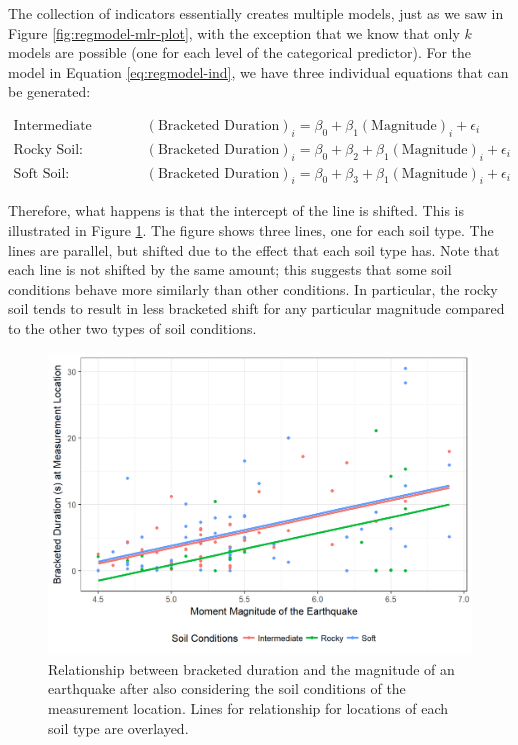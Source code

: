 \documentclass[]{book}
\theoremstyle{definition}
\theoremstyle{definition}
\theoremstyle{definition}
\theoremstyle{remark}
\begin{document}
The collection of indicators essentially creates multiple models, just
as we saw in Figure \ref{fig:regmodel-mlr-plot}, with the exception that
we know that only \(k\) models are possible (one for each level of the
categorical predictor). For the model in Equation \eqref{eq:regmodel-ind},
we have three individual equations that can be generated:

\[
\begin{aligned}
  \text{Intermediate Soil:} &\quad (\text{Bracketed Duration})_i = \beta_0 + \beta_1(\text{Magnitude})_i + \epsilon_i\\
  \text{Rocky Soil:} &\quad (\text{Bracketed Duration})_i = \beta_0 + \beta_2 + \beta_1(\text{Magnitude})_i + \epsilon_i\\
  \text{Soft Soil:} &\quad (\text{Bracketed Duration})_i = \beta_0 + \beta_3 + \beta_1(\text{Magnitude})_i + \epsilon_i
\end{aligned}
\]

Therefore, what happens is that the intercept of the line is shifted.
This is illustrated in Figure \ref{fig:regmodel-ind-plot}. The figure
shows three lines, one for each soil type. The lines are parallel, but
shifted due to the effect that each soil type has. Note that each line
is not shifted by the same amount; this suggests that some soil
conditions behave more similarly than other conditions. In particular,
the rocky soil tends to result in less bracketed shift for any
particular magnitude compared to the other two types of soil conditions.

\begin{figure}

{\centering \includegraphics[width=0.8\linewidth]{./Images/regmodel-ind-plot-1} 

}

\caption{Relationship between bracketed duration and the magnitude of an earthquake after also considering the soil conditions of the measurement location.  Lines for relationship for locations of each soil type are overlayed.}\label{fig:regmodel-ind-plot}
\end{figure}
\end{document}

